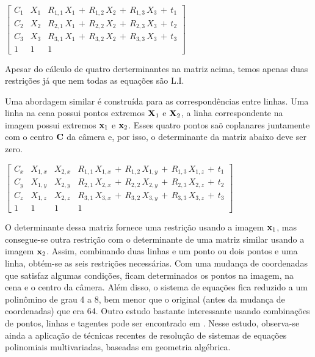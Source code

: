 \begin{center}
$\begin{bmatrix}
C_1 & X_1 & R_{1,1}\,X_1\,+\,R_{1,2}\,X_2\,+\,R_{1,3}\,X_3\,+\,t_1 \\ 
C_2 & X_2 & R_{2,1}\,X_1\,+\,R_{2,2}\,X_2\,+\,R_{2,3}\,X_3\,+\,t_2 \\ 
C_3 & X_3 & R_{3,1}\,X_1\,+\,R_{3,2}\,X_2\,+\,R_{3,3}\,X_3\,+\,t_3 \\ 
1 & 1 & 1
\end{bmatrix} $
\end{center}

Apesar do cálculo de quatro derterminantes na matriz acima, temos apenas duas restrições já que nem todas as equações são L.I.

Uma abordagem similar é construída para as correspondências entre linhas. Uma linha na cena possui pontos extremos ${\bf X}_1$ e ${\bf X}_2$, a linha correspondente na imagem possui extremos ${\bf x}_1$ e ${\bf x}_2$. Esses quatro pontos saõ coplanares juntamente com o centro ${\bf C}$ da câmera e, por isso, o determinante da matriz abaixo deve ser zero.

\begin{center}
$\begin{bmatrix}
C_x & X_{1,x} & X_{2,x} & R_{1,1}\,X_{1,x}\,+\,R_{1,2}\,X_{1,y}\,+\,R_{1,3}\,X_{1,z}\,+\,t_1 \\ 
C_y & X_{1,y} & X_{2,y} & R_{2,1}\,X_{2,x}\,+\,R_{2,2}\,X_{2,y}\,+\,R_{2,3}\,X_{2,z}\,+\,t_2 \\ 
C_z & X_{1,z} & X_{2,z} & R_{3,1}\,X_{3,x}\,+\,R_{3,2}\,X_{3,y}\,+\,R_{3,3}\,X_{3,z}\,+\,t_3 \\ 
1 & 1 & 1 & 1
\end{bmatrix} $
\end{center}

O determinante dessa matriz fornece uma restrição usando a imagem ${\bf x}_1$, mas consegue-se outra restrição com o determinante de uma matriz similar usando a imagem ${\bf x}_2$. Assim, combinando duas linhas e um ponto ou dois pontos e uma linha, obtém-se as seis restrições necessárias. Com uma mudança de coordenadas que satisfaz algumas condições, ficam determinados os pontos na imagem, na cena e o centro da câmera. Além disso, o sistema de equações fica reduzido a um polinômino de grau 4 a 8, bem menor que o original (antes da mudança de coordenadas) que era 64. Outro estudo bastante interessante usando combinações de pontos, linhas e tagentes  pode ser encontrado em \cite{bib:kuang}. Nesse estudo, observa-se ainda a aplicação de técnicas recentes de resolução de sistemas de equações polinomiais multivariadas, baseadas em geometria algébrica. 

